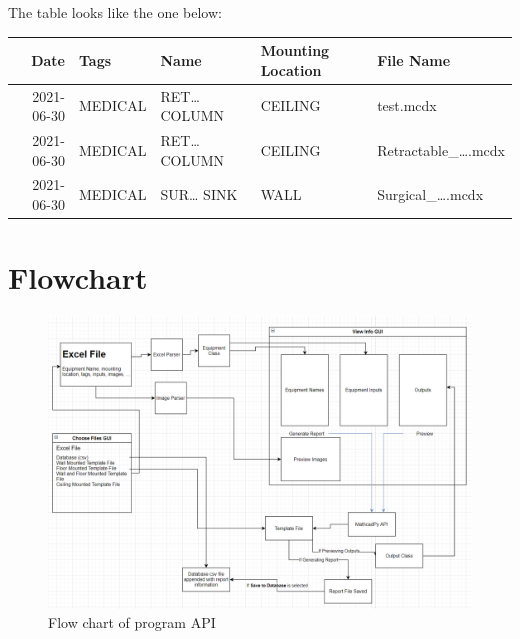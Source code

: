 \documentclass[11pt]{article}
\begin{document}
The table looks like the one below:
\begin{center}
\begin{tabular}{rllll}
\hline
Date & Tags & Name & Mounting Location & File Name\\
\hline
2021-06-30 & MEDICAL & RET\ldots{} COLUMN & CEILING & test.mcdx\\
2021-06-30 & MEDICAL & RET\ldots{} COLUMN & CEILING & Retractable\_\ldots{}.mcdx\\
2021-06-30 & MEDICAL & SUR\ldots{} SINK & WALL & Surgical\_\ldots{}.mcdx\\
\hline
\end{tabular}
\end{center}
\section{Flowchart}
\label{sec:org2688bed}
\begin{figure}[htbp]
\centering
\includegraphics[width=.9\linewidth]{./dist/documentation/component_flowchart.png}
\caption{\label{fig:1}Flow chart of program API}
\end{figure}
\end{document}

